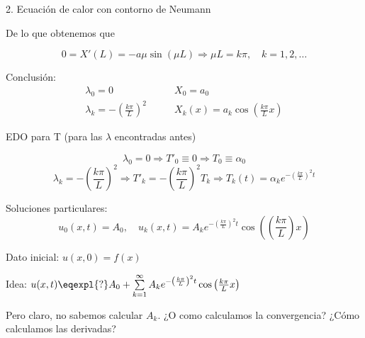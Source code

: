 \begin{example}{2. Ecuación de calor con contorno de Neumann}
\begin{itemize}
			 	De lo que obtenemos que

			 	\[0 = X'(L) = -a \mu \sin(\mu L) \Rightarrow \mu L = k \pi , \quad k = 1,2,…\]



		\end{itemize}

		Conclusión:
				\begin{align*}
					\lambda_0 = 0\quad & \quad X_0 = a_0 \\
					\lambda_k = - \left(\frac{k\pi}{L}\right)^2\quad & \quad X_k(x) = a_k \cos (\frac{k \pi}{L}x)
				\end{align*}

			 	EDO para T (para las $\lambda$ encontradas antes)

			 	\[\lambda_0 = 0 \Rightarrow T'_0 \equiv 0 \Rightarrow T_0 \equiv \alpha_0\]
			 	\[\lambda_k = - \left(\frac{k\pi}{L}\right)^2 \Rightarrow T'_k = -\left(\frac{k\pi}{L}\right)^2 T_k \Rightarrow T_k (t) = \alpha_k e^{-\left(\frac{k\pi}{L}\right)^2 t} \]

			 	Soluciones particulares:
			 	\[u_0(x,t) = A_0, \quad u_k (x,t) = A_k e^{-\left(\frac{k \pi}{L} \right)^2 t} \cos \left( \left( \frac{k \pi}{L}\right) x \right) \]

			 	Dato inicial: $u(x,0) = f(x)$

			 	Idea: $u(x,t) \eqexpl{?} A_0 + \sum\limits_{k=1}^{\infty} A_k e^{- \left( \frac{k \pi}{L} \right)^2 t}  \cos \left( \frac{k \pi}{L} x \right)$

			 	Pero claro, no sabemos calcular $A_k$. ¿O como calculamos la convergencia? ¿Cómo calculamos las derivadas?


		\end{example}

